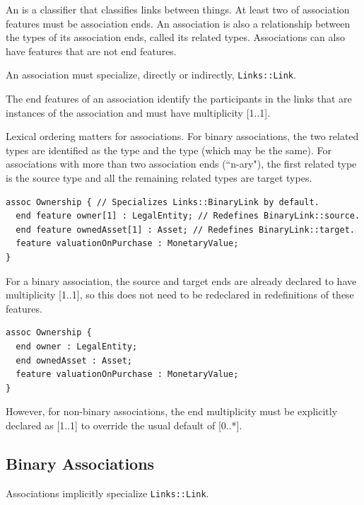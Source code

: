 

\pn An  is a  {classifier} that classifies links between things.
At least two of association features must be association {ends}.
An association is also a {relationship} between the types of its association ends, called its related types.
Associations can also have features that are not end features.

\pn An association must specialize, directly or indirectly, \texttt{Links::Link}.

\pn The end features of an association identify the participants in the links that are {instances}
of the association and must have multiplicity [1..1].

\pn Lexical ordering matters for associations.
For binary associations, the two related
types are identified as the  type and the  type (which may be the same).
For associations with more than
two association ends (``n-ary"), the first related type is the source type and all the remaining related types are target
types.

\begin{lstlisting}
assoc Ownership { // Specializes Links::BinaryLink by default.
  end feature owner[1] : LegalEntity; // Redefines BinaryLink::source.
  end feature ownedAsset[1] : Asset; // Redefines BinaryLink::target.
  feature valuationOnPurchase : MonetaryValue;
}
\end{lstlisting}

\pn For a binary association, the source and target ends are already declared to have multiplicity [1..1], so this
does not need to be redeclared in redefinitions of these features. 

\begin{lstlisting}
assoc Ownership {
  end owner : LegalEntity;
  end ownedAsset : Asset;
  feature valuationOnPurchase : MonetaryValue;
}
\end{lstlisting}

\pn However, for non-binary associations, the end
multiplicity must be explicitly declared as [1..1] to override the usual default of [0..*].

\subsection{Binary Associations}

\pn Associations implicitly specialize \texttt{Links::Link}.

